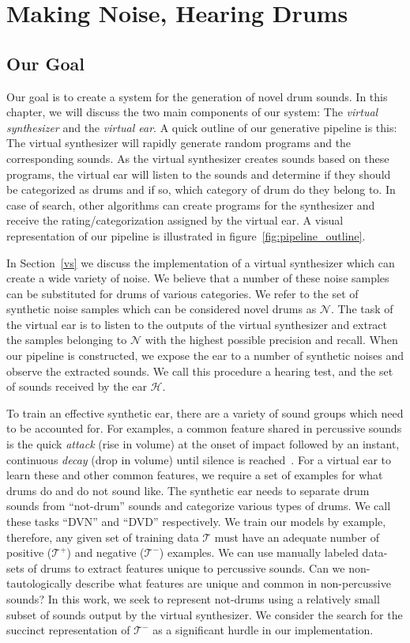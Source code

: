 \documentclass[\main/thesis.tex]{subfiles}
\begin{document}
\chapter{Making Noise, Hearing Drums}
\label{implementation}


\section{Our Goal}
Our goal is to create a system for the generation of novel drum sounds. In this chapter, we will discuss the two main components of our system: The \textit{virtual synthesizer} and the \textit{virtual ear}. A quick outline of our generative pipeline is this: The virtual synthesizer will rapidly generate random programs and the corresponding sounds. As the virtual synthesizer creates sounds based on these programs, the virtual ear will listen to the sounds and determine if they should be categorized as drums and if so, which category of drum do they belong to. In case of search, other algorithms can create programs for the synthesizer and receive the rating/categorization assigned by the virtual ear. A visual representation of our pipeline is illustrated in  figure~\ref{fig:pipeline_outline}.

In Section~\ref{vs} we discuss the implementation of a virtual synthesizer which can create a wide variety of noise. We believe that a number of these noise samples can be substituted for drums of various categories. We refer to the set of synthetic noise samples which can be considered novel drums as $\mathcal{N}$. The task of the virtual ear is to listen to the outputs of the virtual synthesizer and extract the samples belonging to $\mathcal{N}$ with the highest possible precision and recall. When our pipeline is constructed, we expose the ear to a number of synthetic noises and observe the extracted sounds. We call this procedure a hearing test, and the set of sounds received by the ear $\mathcal{H}$. 

To train an effective synthetic ear, there are a variety of sound groups which need to be accounted for. For examples, a common feature shared in percussive sounds is the quick \emph{attack} (rise in volume) at the onset of impact followed by an instant, continuous \emph{decay} (drop in volume) until silence is reached~\cite{barry2005drum}. For a virtual ear to learn these and other common features, we require a set of examples for what drums do and do not sound like. The synthetic ear needs to separate drum sounds from \enquote{not-drum} sounds and categorize various types of drums. We call these tasks \enquote{DVN} and \enquote{DVD} respectively. We train our models by example, therefore, any given set of training data $\mathcal{T}$ must have an adequate number of positive ($\mathcal{T^{+}}$) and negative ($\mathcal{T^{-}}$) examples. We can use manually labeled data-sets of drums to extract features unique to percussive sounds. Can we non-tautologically describe what features are unique and common in non-percussive sounds? In this work, we seek to represent not-drums using a relatively small subset of sounds output by the virtual synthesizer. We consider the search for the succinct representation of $\mathcal{T^{-}}$ as a significant hurdle in our implementation.
\end{document}
